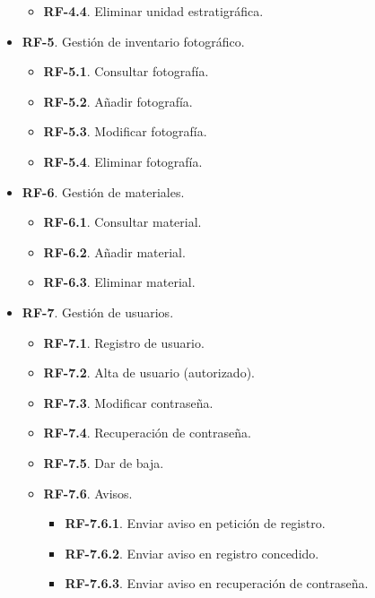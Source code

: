 \begin{itemize}
\begin{itemize}
                \item \textbf{RF-4.4}. Eliminar unidad estratigráfica.          
            \end{itemize}
        \item \textbf{RF-5}. Gestión de inventario fotográfico.
            \begin{itemize}
                \item \textbf{RF-5.1}. Consultar fotografía.
                \item \textbf{RF-5.2}. Añadir fotografía.
                \item \textbf{RF-5.3}. Modificar fotografía.
                \item \textbf{RF-5.4}. Eliminar fotografía.    
            \end{itemize}
        \item \textbf{RF-6}. Gestión de materiales.
            \begin{itemize}
                \item \textbf{RF-6.1}. Consultar material.
                \item \textbf{RF-6.2}. Añadir material.
                \item \textbf{RF-6.3}. Eliminar material.    
            \end{itemize}
        \item \textbf{RF-7}. Gestión de usuarios.
            \begin{itemize}
                \item \textbf{RF-7.1}. Registro de usuario.
                \item \textbf{RF-7.2}. Alta de usuario (autorizado).
                \item \textbf{RF-7.3}. Modificar contraseña.
                \item \textbf{RF-7.4}. Recuperación de contraseña.
                \item \textbf{RF-7.5}. Dar de baja.
                \item \textbf{RF-7.6}. Avisos.
                    \begin{itemize}
                        \item \textbf{RF-7.6.1}. Enviar aviso en petición de registro.
                        \item \textbf{RF-7.6.2}. Enviar aviso en registro concedido.
                        \item \textbf{RF-7.6.3}. Enviar aviso en recuperación de contraseña.
                    \end{itemize}

\end{itemize}
\end{itemize}
